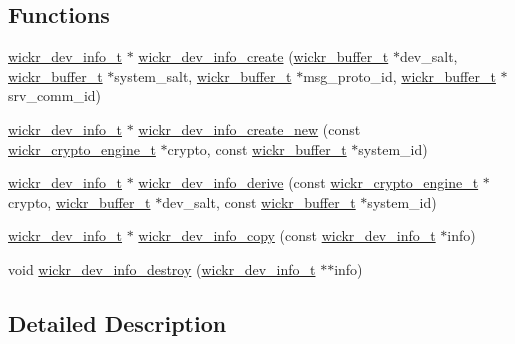 \subsection*{Functions}
\begin{DoxyCompactItemize}
\item 
\hyperlink{structwickr__dev__info}{wickr\+\_\+dev\+\_\+info\+\_\+t} $\ast$ \hyperlink{group__wickr__dev__info_gaadd5ceb4c6ed757440332e8e27109e5e}{wickr\+\_\+dev\+\_\+info\+\_\+create} (\hyperlink{structwickr__buffer}{wickr\+\_\+buffer\+\_\+t} $\ast$dev\+\_\+salt, \hyperlink{structwickr__buffer}{wickr\+\_\+buffer\+\_\+t} $\ast$system\+\_\+salt, \hyperlink{structwickr__buffer}{wickr\+\_\+buffer\+\_\+t} $\ast$msg\+\_\+proto\+\_\+id, \hyperlink{structwickr__buffer}{wickr\+\_\+buffer\+\_\+t} $\ast$srv\+\_\+comm\+\_\+id)
\item 
\hyperlink{structwickr__dev__info}{wickr\+\_\+dev\+\_\+info\+\_\+t} $\ast$ \hyperlink{group__wickr__dev__info_gadbe4731cffb188da317ed9237826ac5d}{wickr\+\_\+dev\+\_\+info\+\_\+create\+\_\+new} (const \hyperlink{structwickr__crypto__engine}{wickr\+\_\+crypto\+\_\+engine\+\_\+t} $\ast$crypto, const \hyperlink{structwickr__buffer}{wickr\+\_\+buffer\+\_\+t} $\ast$system\+\_\+id)
\item 
\hyperlink{structwickr__dev__info}{wickr\+\_\+dev\+\_\+info\+\_\+t} $\ast$ \hyperlink{group__wickr__dev__info_ga7f81b96fc222560762d608772b3f44bd}{wickr\+\_\+dev\+\_\+info\+\_\+derive} (const \hyperlink{structwickr__crypto__engine}{wickr\+\_\+crypto\+\_\+engine\+\_\+t} $\ast$crypto, \hyperlink{structwickr__buffer}{wickr\+\_\+buffer\+\_\+t} $\ast$dev\+\_\+salt, const \hyperlink{structwickr__buffer}{wickr\+\_\+buffer\+\_\+t} $\ast$system\+\_\+id)
\item 
\hyperlink{structwickr__dev__info}{wickr\+\_\+dev\+\_\+info\+\_\+t} $\ast$ \hyperlink{group__wickr__dev__info_ga1c9d2bdc1778166c49aec43906bb1a83}{wickr\+\_\+dev\+\_\+info\+\_\+copy} (const \hyperlink{structwickr__dev__info}{wickr\+\_\+dev\+\_\+info\+\_\+t} $\ast$info)
\item 
void \hyperlink{group__wickr__dev__info_ga09ee324a0e0e6a0451aa53031eecb324}{wickr\+\_\+dev\+\_\+info\+\_\+destroy} (\hyperlink{structwickr__dev__info}{wickr\+\_\+dev\+\_\+info\+\_\+t} $\ast$$\ast$info)
\end{DoxyCompactItemize}


\subsection{Detailed Description}


